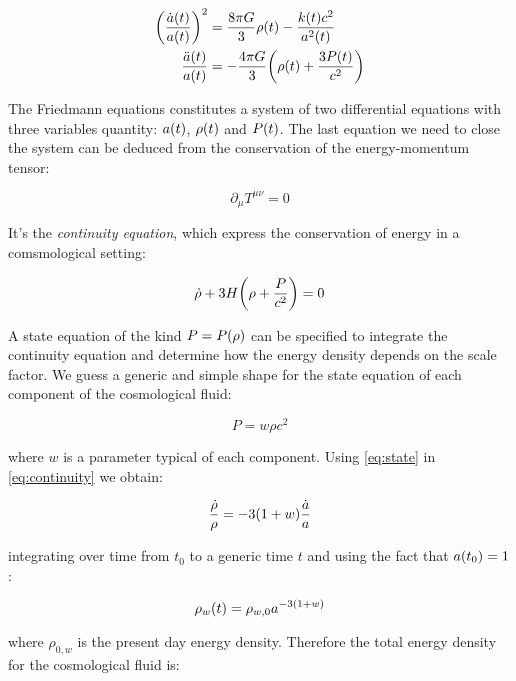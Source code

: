 \begin{align}
        \qty(\frac{\dot a\qty(t)}{a\qty(t)})^2 & = \frac{8\pi G}{3} \rho\qty(t)
        - \frac{k\qty(t) c^2}{a^2\qty(t)}
        \label{eq:friedmann_1} \\
        \frac{\ddot a\qty(t)}{a\qty(t)} & = -\frac{4\pi G}{3}
        \qty(\rho\qty(t) + \frac{3 P\qty(t)}{c^2})
        \label{eq:friedmann_2}
\end{align}

The Friedmann equations constitutes a system of two differential equations
with three variables quantity: $a\qty(t)$, $\rho\qty(t)$ and $P\qty(t)$.
The last equation we need to close the system can be deduced from the
conservation of the energy-momentum tensor:

\begin{equation}
        \partial_\mu T^{\mu \nu} = 0 
\end{equation}

It's the \emph{continuity equation}, which express the conservation of energy in a
comsmological setting:

\begin{equation}
        \dot \rho + 3 H \qty(\rho + \frac{P}{c^2}) = 0
        \label{eq:continuity}
\end{equation}

A state equation of the kind $P = P\qty(\rho)$ can be specified to
integrate the continuity equation and determine how the energy density
depends on the scale factor. We guess a generic and simple shape for the
state equation of each component of the cosmological fluid:

\begin{equation}
        P = w \rho c^2 
        \label{eq:state}
\end{equation}

where $w$ is a parameter typical of each component.
Using \autoref{eq:state} in \autoref{eq:continuity} we obtain:

\begin{equation}
        \frac{\dot \rho}{\rho} = -3\qty(1 + w) \frac{\dot a}{a} 
\end{equation}

integrating over time from $t_0$ to a generic time $t$ and using the fact
that $a\qty(t_0) = 1$:

\begin{equation}
        \rho_w\qty(t) = \rho_{w,0} a^{-3\qty(1 + w)} 
\end{equation}

where $\rho_{0,w}$ is the present day energy density.
Therefore the total energy density for the cosmological fluid is:

